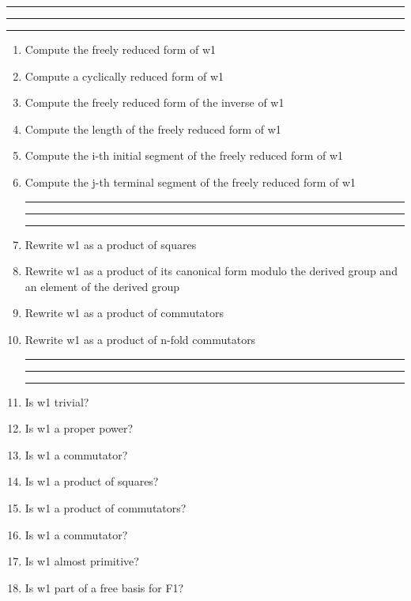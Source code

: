 
\bigskip
\hrule\hrule\hrule

\begin{enumerate}

\item Compute the freely reduced form of w1

\item Compute a cyclically reduced form of w1

\item Compute the freely reduced form of the inverse of w1

\item Compute the length of the freely reduced form of w1

\item Compute the i-th initial segment of the freely reduced form of w1

\item Compute the j-th terminal segment of the freely reduced form of w1

\bigskip
\hrule\hrule\hrule

\item Rewrite w1 as a product of squares

\item Rewrite w1 as a product of its canonical form modulo the derived group
and an element of the derived group

\item Rewrite w1 as a product of commutators

\item Rewrite w1 as a product of n-fold commutators

\bigskip
\hrule\hrule\hrule

\item Is w1 trivial?

\item Is w1 a proper power?

\item Is w1 a commutator?

\item Is w1 a product of squares?

\item Is w1 a product of commutators?

\item Is w1 a commutator?

\item Is w1 almost primitive?

\item Is w1 part of a free basis for F1?


\end{enumerate}
